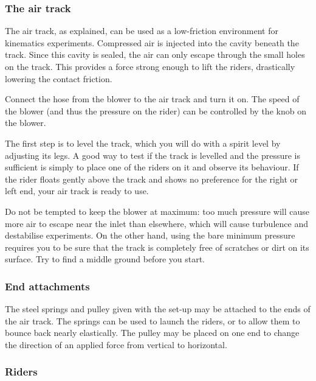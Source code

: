 \subsubsection*{The air track}

The air track, as explained, can be used as a low-friction environment for kinematics experiments. Compressed air is injected into the cavity beneath the track. Since this cavity is sealed, the air can only escape through the small holes on the track. This provides a force strong enough to lift the riders, drastically lowering the contact friction.

Connect the hose from the blower to the air track and turn it on. The speed of the blower (and thus the pressure on the rider) can be controlled by the knob on the blower.

The first step is to level the track, which you will do with a spirit level by adjusting its legs. A good way to test if the track is levelled and the pressure is sufficient is simply to place one of the riders on it and observe its behaviour. If the rider floats gently above the track and shows no preference for the right or left end, your air track is ready to use. 

\begin{tip}
Do not be tempted to keep the blower at maximum: too much pressure will cause more air to escape near the inlet than elsewhere, which will cause turbulence and destabilise experiments. On the other hand, using the bare minimum pressure requires you to be sure that the track is completely free of scratches or dirt on its surface. Try to find a middle ground before you start.
\end{tip}

\subsubsection*{End attachments}

The steel springs and pulley given with the set-up may be attached to the ends of the air track. The springs can be used to launch the riders, or to allow them to bounce back nearly elastically. The pulley may be placed on one end to change the direction of an applied force from vertical to horizontal.

\subsubsection*{Riders}

